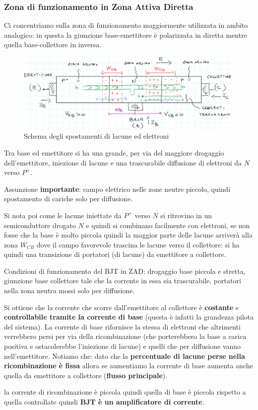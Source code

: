 \documentclass[11pt,a4paper,]{article}
\begin{document}
\subsubsection{Zona di funzionamento in Zona Attiva Diretta}
Ci concentriamo sulla zona di funzionamento maggiormente utilizzata in ambito analogico: in questa la giunzione base-emettitore è polarizzata in diretta mentre quella base-collettore in inversa.
\begin{figure}[H]
    \centering
    \includegraphics[width=0.5\linewidth]{img/spost car el.png}
    \caption{Schema degli spostamenti di lacune ed elettroni}
\end{figure}
Tra base ed emettitore si ha una grande, per via del maggiore drogaggio dell'emettitore, iniezione di lacune e una trascurabile diffusione di elettroni da $N$ verso $P^+$.

Assunzione \textbf{importante}: campo elettrico nelle zone neutre piccolo, quindi spostamento di cariche solo per diffusione.

Si nota poi come le lacune iniettate da $P^+$ verso $N$ si ritrovino in un semiconduttore drogato $N$ e quindi si combinano facilmente con elettroni, se non fosse che la base è molto piccola quindi la maggior parte delle lacune arriverà alla zona $W_{CB}$ dove il campo favorevole trascina le lacune verso il collettore: si ha quindi una transizione di portatori (di lacune) da emettitore a collettore.
\begin{nota}
    Condizioni di funzionamento del BJT in ZAD: drogaggio base piccola e stretta, giunzione base collettore tale che la corrente in essa sia trascurabile, portatori nella zona neutra mossi solo per diffusione.
\end{nota}
Si ottiene che la corrente che scorre dall'emettitore al collettore è \textbf{costante} e \textbf{controllabile tramite la corrente di base} (questa è infatti la grandezza pilota del sistema).
La corrente di base rifornisce la stessa di elettroni che altrimenti verrebbero persi per via della ricombinazione (che porterebbero la base a carica positiva e ostacolerebbe l'iniezione di lacune) e quelli che per diffusione vanno nell'emettitore.
Notiamo che: dato che la \textbf{percentuale di lacune perse nella ricombinazione è fissa} allora se aumentiamo la corrente di base aumenta anche quella da emettitore a collettore (\textbf{flusso principale}).
\begin{nota}
    la corrente di ricombinazione è piccola quindi quella di base è piccola rispetto a quella controllate quindi \textbf{BJT è un amplificatore di corrente}.
\end{nota}
\end{document}
